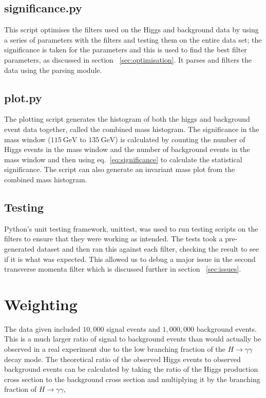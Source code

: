 \documentclass[11pt]{amsart}
\begin{document}
\begin{multicols}{2}
\subsection{significance.py}

This script optimises the filters used on the Higgs and background data by using a series of parameters with the filters and testing them on the entire data set; the significance is taken for the parameters and this is used to find the best filter parameters, as discussed in section ~\ref{sec:optimisation}. It parses and filters the data using the parsing module.

\subsection{plot.py}

The plotting script generates the histogram of both the higgs and background event data together, called the combined mass histogram. The significance in the mass window ($\SI{115}{\giga\electronvolt}$ to $\SI{135}{\giga\electronvolt}$) is calculated by counting the number of Higgs events in the mass window and the number of background events in the mass window and then using eq.~\ref{eq:significance} to calculate the statistical significance. The script can also generate an invariant mass plot from the combined mass histogram.

\subsection{Testing}
\label{sec:testing}

Python's unit testing framework, unittest, was used to run testing scripts on the filters to ensure that they were working as intended. The tests took a pre-generated dataset and then ran this against each filter, checking the result to see if it is what was expected. This allowed us to debug a major issue in the second transverse momenta filter which is discussed further in section ~\ref{sec:issues}.

\section{Weighting}

The data given included $10,000$ signal events and $1,000,000$ background events. This is a much larger ratio of signal to background events than would actually be observed in a real experiment due to the low branching fraction of the $H \to \gamma\gamma$ decay mode. The theoretical ratio of the observed Higgs events to observed background events can be calculated by taking the ratio of the Higgs production cross section to the background cross section and multiplying it by the branching fraction of $H \to \gamma\gamma$,


\end{multicols}
\end{document}
